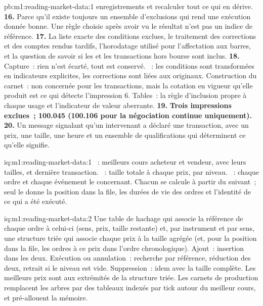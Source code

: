 \begin{solution}{pb:m1:reading-market-data:1}
enregistrements et recalculer tout ce qui en dérive.
\textbf{16.} Parce qu'il existe toujours un ensemble d'exclusions qui rend une
exécution donnée bonne. Une règle choisie après avoir vu le résultat n'est pas un
indice de référence.
\textbf{17.} La liste exacte des conditions exclues, le traitement des
corrections et des comptes rendus tardifs, l'horodatage utilisé pour l'affectation aux barres, et
la question de savoir si les  et les transactions hors bourse sont inclus.
\textbf{18.} Capture~: rien n'est écarté, tout est conservé. ~: les conditions
sont transformées en indicateurs explicites, les corrections sont liées aux originaux. Construction du carnet~:
non concernée pour les transactions, mais la cotation en vigueur qu'elle produit est ce qui
détecte l'impression 6. Tables~: la règle d'inclusion propre à chaque usage et l'indicateur de
valeur aberrante.
\textbf{19.} \textbf{Trois impressions exclues~; 100.045 (100.106 pour la négociation continue
uniquement).}
\textbf{20.} Un message signalant qu'un intervenant a déclaré une transaction, avec un prix, une
taille, une heure et un ensemble de qualifications qui déterminent ce qu'elle signifie.
\end{solution}

\begin{solution}{iq:m1:reading-market-data:1}
~: meilleurs cours acheteur et vendeur, avec leurs tailles, et dernière transaction. ~: taille totale
à chaque prix, par niveau. ~: chaque ordre et chaque événement le concernant. Chacun se
calcule à partir du suivant~; seul le  donne la position dans la file, les durées de vie
des ordres et l'identité de ce qui a été exécuté.
\end{solution}

\begin{solution}{iq:m1:reading-market-data:2}
Une table de hachage qui associe la référence de chaque ordre à celui-ci (sens, prix, taille restante)
et, par instrument et par sens, une structure triée qui associe chaque prix à la taille agrégée
(et, pour la position dans la file, les ordres à ce prix dans l'ordre chronologique). Ajout~:
insertion dans les deux. Exécution ou annulation~: recherche par référence, réduction des deux, retrait
si le niveau est vide. Suppression~: idem avec la taille complète. Les meilleurs prix sont aux extrémités de
la structure triée. Les carnets de production remplacent les arbres par des tableaux indexés
par tick autour du meilleur cours, et pré-allouent la mémoire.
\end{solution}

